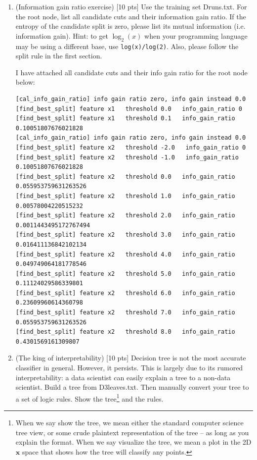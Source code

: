\documentclass[a4paper]{article}
\theoremstyle{definition}
\def\x{\mathbf x}
\begin{document}
\begin{enumerate}
\item (Information gain ratio exercise)  [10 pts] Use the training set Druns.txt.  For the root node, list all candidate cuts and their information gain ratio. If the entropy of the candidate split is zero, please list its mutual information (i.e. information gain). Hint: to get $\log_2(x)$ when your programming language may be using a different base, use \verb|log(x)/log(2)|. Also, please follow the split rule in the first section. \\
{\color{blue}
I have attached all candidate cuts and their info gain ratio for the root node below:
\begin{verbatim}
[cal_info_gain_ratio] info gain ratio zero, info gain instead 0.0
[find_best_split] feature x1   threshold 0.0   info_gain_ratio 0
[find_best_split] feature x1   threshold 0.1   info_gain_ratio 0.10051807676021828
[cal_info_gain_ratio] info gain ratio zero, info gain instead 0.0
[find_best_split] feature x2   threshold -2.0   info_gain_ratio 0
[find_best_split] feature x2   threshold -1.0   info_gain_ratio 0.10051807676021828
[find_best_split] feature x2   threshold 0.0   info_gain_ratio 0.055953759631263526
[find_best_split] feature x2   threshold 1.0   info_gain_ratio 0.00578004220515232
[find_best_split] feature x2   threshold 2.0   info_gain_ratio 0.0011443495172767494
[find_best_split] feature x2   threshold 3.0   info_gain_ratio 0.016411136842102134
[find_best_split] feature x2   threshold 4.0   info_gain_ratio 0.049749064181778546
[find_best_split] feature x2   threshold 5.0   info_gain_ratio 0.11124029586339801
[find_best_split] feature x2   threshold 6.0   info_gain_ratio 0.23609960614360798
[find_best_split] feature x2   threshold 7.0   info_gain_ratio 0.055953759631263526
[find_best_split] feature x2   threshold 8.0   info_gain_ratio 0.4301569161309807
\end{verbatim}
}
\item (The king of interpretability)  [10 pts] Decision tree is not the most accurate classifier in general.  However, it persists.  This is largely due to its rumored interpretability: a data scientist can easily explain a tree to a non-data scientist.  Build a tree from D3leaves.txt.  Then manually convert your tree to a set of logic rules.  Show the tree\footnote{When we say show the tree, we mean either the standard computer science tree view, or some crude plaintext representation of the tree -- as long as you explain the format.  When we say visualize the tree, we mean a plot in the 2D $\x$ space that shows how the tree will classify any points.} and the rules. \\


\end{enumerate}
\end{document}
